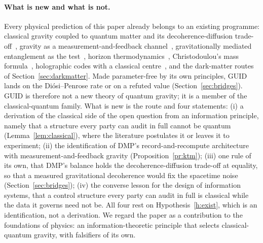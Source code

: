 \documentclass[11pt,a4paper]{article}
\theoremstyle{definition}
\theoremstyle{remark}
\theoremstyle{definition}
\begin{document}
\paragraph{What is new and what is not.} Every physical prediction of this paper already belongs to an existing programme: classical
gravity coupled to quantum matter and its decoherence-diffusion trade-off~\cite{oppenheim,osswd}, gravity as a measurement-and-feedback
channel~\cite{ktm,tilloydiosi}, gravitationally mediated entanglement as the test~\cite{bose,mv,ggs}, horizon
thermodynamics~\cite{unruh,hawking75,jacobson95}, Christodoulou's mass formula~\cite{christodoulou}, holographic codes with a classical
centre~\cite{harlow}, and the dark-matter routes of Section~\ref{sec:darkmatter}. Made parameter-free by its own principles, GUID lands on
the Di\'osi--Penrose rate or on a refuted value (Section~\ref{sec:bridges}). GUID is therefore not a new theory of quantum gravity; it is a
member of the classical-quantum family. What is new is the route and four statements: (i) a derivation of the classical side of the open
question from an information principle, namely that a structure every party can audit in full cannot be quantum (Lemma~\ref{lem:classical}),
where the literature postulates it or leaves it to experiment; (ii) the identification of DMP's record-and-recompute architecture with
measurement-and-feedback gravity (Proposition~\ref{pr:ktm}); (iii) one rule of its own, that DMP's balance holds the decoherence-diffusion
trade-off at equality, so that a measured gravitational decoherence would fix the spacetime noise (Section~\ref{sec:bridges}); (iv) the
converse lesson for the design of information systems, that a control structure every party can audit in full is classical while the data
it governs need not be. All four rest on Hypothesis~\ref{h:exist}, which is an identification, not a derivation. We regard the paper as a
contribution to the foundations of physics: an information-theoretic principle that selects classical-quantum gravity, with falsifiers of
its own.
\end{document}
